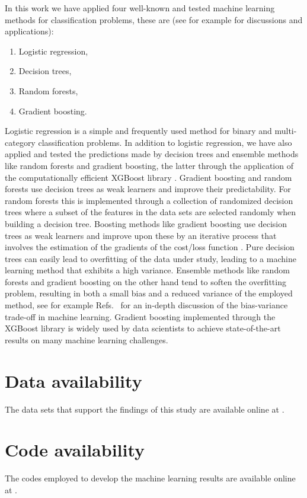 \documentclass[superscriptaddress,unsortedaddress,
 amsmath,amssymb,
 aps,
]{revtex4-2}
\begin{document}
In this work we have applied four well-known and tested machine learning methods for classification problems, these are (see for example \cite{Hastie2009,Mehta2019} for discussions and applications):
\begin{enumerate}
    \item Logistic regression,
    \item Decision trees,
    \item Random forests,
    \item Gradient boosting.
\end{enumerate}
Logistic regression \cite{Hastie2009} is a simple and frequently used method for binary and multi-category classification problems. In addition to logistic regression, we have also applied and tested the predictions made by decision trees and ensemble methods like random forests and gradient boosting, the latter through the application of the computationally efficient  XGBoost library \cite{xgboost2016}. Gradient boosting and random forests use decision trees as weak learners and improve their predictability. For random forests this is implemented through a collection of randomized decision trees where a  subset of the features in the data sets are selected randomly when building a decision tree. Boosting methods like gradient boosting use decision trees as  weak learners and improve upon these by an iterative process that involves the estimation of the gradients of the cost/loss function \cite{Hastie2009}. Pure decision trees can easily lead to overfitting of the data under study, leading to a machine learning method that exhibits a high variance. Ensemble methods like random forests and gradient boosting on the other hand tend to soften the overfitting problem, resulting in both a small bias and a reduced variance of the employed method, see for example Refs.~\cite{Hastie2009,Mehta2019} for an in-depth discussion of the bias-variance trade-off in machine learning. Gradient boosting implemented through the  XGBoost library \cite{xgboost2016} is widely used by data scientists to achieve state-of-the-art results on many machine learning challenges. 

\section*{Data availability} 
The data sets that support the findings of this study are available online at \cite{Ohebbi2021}.

\section*{Code availability} 
The codes employed to develop the machine learning results are available online at 
\cite{Ohebbi2021}.
\end{document}
